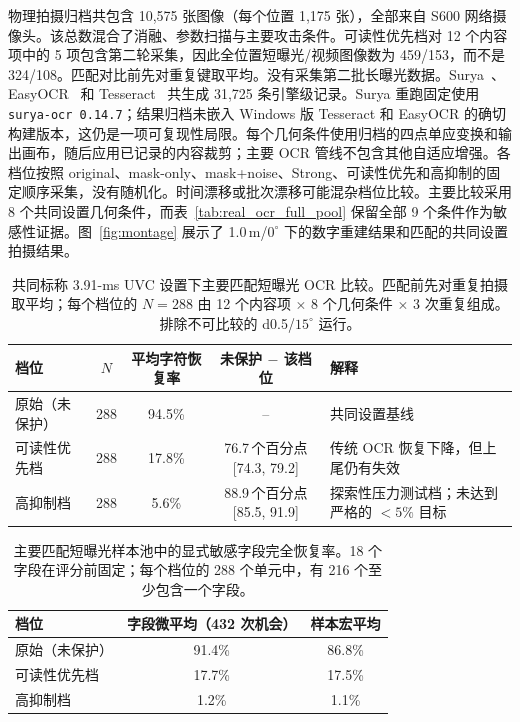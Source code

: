 物理拍摄归档共包含 10,575 张图像（每个位置 1,175 张），全部来自 S600 网络摄像头。该总数混合了消融、参数扫描与主要攻击条件。可读性优先档对 12 个内容项中的 5 项包含第二轮采集，因此全位置短曝光/视频图像数为 459/153，而不是 324/108。匹配对比前先对重复键取平均。没有采集第二批长曝光数据。Surya~\cite{b_surya2024}、EasyOCR~\cite{b_easyocr2020} 和 Tesseract~\cite{b_smith2007} 共生成 31,725 条引擎级记录。Surya 重跑固定使用 \texttt{surya-ocr 0.14.7}；结果归档未嵌入 Windows 版 Tesseract 和 EasyOCR 的确切构建版本，这仍是一项可复现性局限。每个几何条件使用归档的四点单应变换和输出画布，随后应用已记录的内容裁剪；主要 OCR 管线不包含其他自适应增强。各档位按照 original、mask-only、mask+noise、Strong、可读性优先和高抑制的固定顺序采集，没有随机化。时间漂移或批次漂移可能混杂档位比较。主要比较采用 8 个共同设置几何条件，而表~\ref{tab:real_ocr_full_pool} 保留全部 9 个条件作为敏感性证据。图~\ref{fig:montage} 展示了 1.0\,m/$0^{\circ}$ 下的数字重建结果和匹配的共同设置拍摄结果。

\begin{table}[!t]
\caption{共同标称 3.91-ms UVC 设置下主要匹配短曝光 OCR 比较。匹配前先对重复拍摄取平均；每个档位的 $N=288$ 由 12 个内容项 $\times$ 8 个几何条件 $\times$ 3 次重复组成。排除不可比较的 d0.5/$15^{\circ}$ 运行。}
\label{tab:real_ocr_common}
\centering
\footnotesize
\setlength{\tabcolsep}{4.6pt}
\begin{tabular}{lcccl}
\toprule
档位 & $N$ & 平均字符恢复率 & 未保护 $-$ 该档位 & 解释 \\
\midrule
原始（未保护） & 288 & 94.5\% & -- & 共同设置基线 \\
可读性优先档 & 288 & 17.8\% & 76.7\,个百分点 [74.3, 79.2] & 传统 OCR 恢复下降，但上尾仍有失效 \\
高抑制档 & 288 & 5.6\% & 88.9\,个百分点 [85.5, 91.9] & 探索性压力测试档；未达到严格的 $<5\%$ 目标 \\
\bottomrule
\end{tabular}
\end{table}

\begin{table}[!t]
\caption{主要匹配短曝光样本池中的显式敏感字段完全恢复率。18 个字段在评分前固定；每个档位的 288 个单元中，有 216 个至少包含一个字段。}
\label{tab:explicit_fields}
\centering
\footnotesize
\begin{tabular}{lcc}
\toprule
档位 & 字段微平均（432 次机会） & 样本宏平均 \\
\midrule
原始（未保护） & 91.4\% & 86.8\% \\
可读性优先档 & 17.7\% & 17.5\% \\
高抑制档 & 1.2\% & 1.1\% \\
\bottomrule
\end{tabular}
\end{table}

